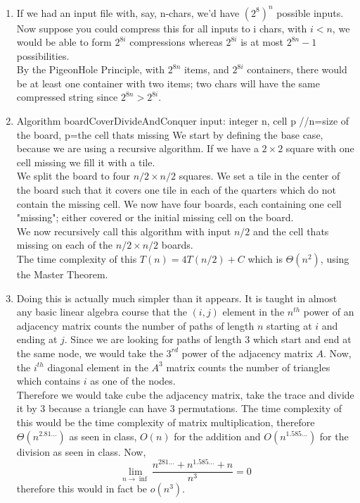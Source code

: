 \begin{enumerate}[1.]
\item
If we had an input file with, say, n-chars, we'd have $(2^8)^n$ possible inputs. \\
Now suppose you could compress this for all inputs to i chars, with $i<n$, we would be able to form $2^{8i}$ compressions whereas $2^{8i}$ is at most $2^{8n}-1$ possibilities.\\
By the PigeonHole Principle, with $2^{8n}$ items, and $2^{8i}$ containers, there would be at least one container with two items; two chars will have the same compressed string since $2^{8n}>2^{8i}$.

\item
Algorithm boardCoverDivideAndConquer
input: integer n, cell p
//n=size of the board, p=the cell thats missing
We start by defining the base case, because we are using a recursive algorithm. If we have a $2\times2$ square with one cell missing we fill it with a tile. \\
We split the board to four $n/2\times n/2$ squares. We set a tile in the center of the board such that it covers one tile in each of the quarters which do not contain the missing cell. We now have four boards, each containing one cell "missing"; either covered or the initial missing cell on the board.\\
We now recursively call this algorithm with input $n/2$ and the cell thats missing on each of the $n/2\times n/2$ boards.\\

The time complexity of this $T(n)=4T(n/2)+C$ which is $\Theta(n^2)$, using the Master Theorem. 

\item
Doing this is actually much simpler than it appears. It is taught in almost any basic linear algebra course that the $(i,j)$ element in the $n^{th}$ power of an adjacency matrix counts the number of paths of length $n$ starting at $i$ and ending at $j$. Since we are looking for paths of length $3$ which start and end at the same node, we would take the $3^{rd}$ power of the adjacency matrix $A$. Now, the $i^{th}$ diagonal element in the $A^3$ matrix counts the number of triangles which contains $i$ as one of the nodes. \\
Therefore we would take cube the adjacency matrix, take the trace and divide it by $3$ because a triangle can have $3$ permutations. The time complexity of this would be the time complexity of matrix multiplication, therefore $\Theta(n^{2.81\dots})$ as seen in class, $O(n)$ for the addition and $O(n^{1.585\dots})$ for the division as seen in class. Now, $$\lim_{n\to \inf}\frac{n^{281\dots}+n^{1.585\dots}+n}{n^3}=0$$ therefore this would in fact be $o(n^3)$.

\end{enumerate}

